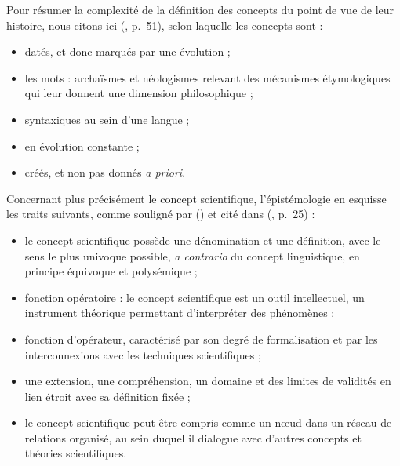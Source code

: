Pour résumer la complexité de la définition des concepts du point de vue de leur histoire, nous citons ici \citeauthor{bal2002travelling} (\citeyear{bal2002travelling}, p.~51), selon laquelle les concepts sont :
\begin{itemize}
	\item datés, et donc marqués par une évolution ;
	\item les mots : archaïsmes et néologismes relevant des mécanismes étymologiques qui leur donnent une dimension philosophique ;
	\item syntaxiques au sein d'une langue ;
	\item en évolution constante ;
	\item créés, et non pas donnés \textit{a priori}.
\end{itemize}
\medskip
Concernant plus précisément le concept scientifique, l'épistémologie en esquisse les traits suivants, comme souligné par \citeauthor{rumelhard1986} (\citeyear{rumelhard1986}) et cité dans \citeauthor{astolfi2008chapitre} (\citeyear{astolfi2008chapitre}, p.~25) :
\begin{itemize}
	\item le concept scientifique possède une dénomination et une définition, avec le sens le plus univoque possible, \textit{a contrario} du concept linguistique, en principe équivoque et polysémique ;
	\item fonction opératoire : le concept scientifique est un outil intellectuel, un instrument théorique permettant d'interpréter des phénomènes ;
	\item fonction d'opérateur, caractérisé par son degré de formalisation et par les interconnexions avec les techniques scientifiques ;
	\item une extension, une compréhension, un domaine et des limites de validités en lien étroit avec sa définition fixée ;
	\item le concept scientifique peut être compris comme un n\oe{}ud dans un réseau de relations organisé, au sein duquel il dialogue avec d'autres concepts et théories scientifiques.
\end{itemize}


